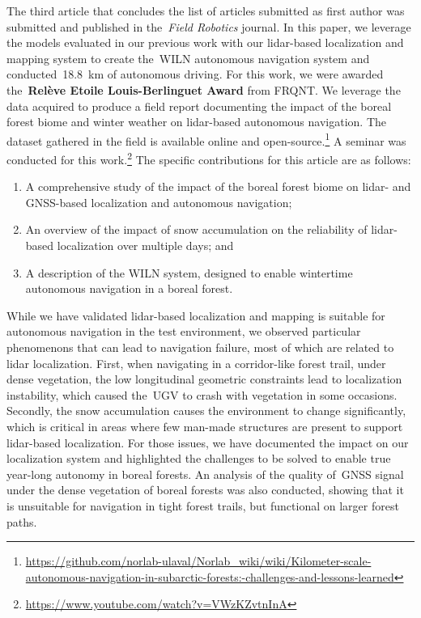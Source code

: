 \documentclass[12pt,letterpaper,oneside]{article}
\begin{document}
The third article that concludes the list of articles submitted as first author was submitted and published in the~\emph{Field Robotics} journal.
In this paper, we leverage the models evaluated in our previous work with our lidar-based localization and mapping system to create the~\ac{WILN} autonomous navigation system and conducted~\SI{18.8}{\kilo\meter} of autonomous driving.
For this work, we were awarded the~\textbf{Relève Etoile Louis-Berlinguet Award} from FRQNT.
We leverage the data acquired to produce a field report documenting the impact of the boreal forest biome and winter weather on lidar-based autonomous navigation.
The dataset gathered in the field is available online and open-source.\footnote{\textwidth\url{https://github.com/norlab-ulaval/Norlab_wiki/wiki/Kilometer-scale-autonomous-navigation-in-subarctic-forests:-challenges-and-lessons-learned}}
A seminar was conducted for this work.\footnote{\url{https://www.youtube.com/watch?v=VWzKZvtnInA}}
The specific contributions for this article are as follows:
\begin{enumerate}
	\item A comprehensive study of the impact of the boreal forest biome on lidar- and \ac{GNSS}-based localization and autonomous navigation;  
	\item An overview of the impact of snow accumulation on the reliability of lidar-based localization over multiple days; and
	\item A description of the \ac{WILN} system, designed to enable wintertime autonomous navigation in a boreal forest.
\end{enumerate}
While we have validated lidar-based localization and mapping is suitable for autonomous navigation in the test environment, we observed particular phenomenons that can lead to navigation failure, most of which are related to lidar localization.
First, when navigating in a corridor-like forest trail, under dense vegetation, the low longitudinal geometric constraints lead to localization instability, which caused the~\ac{UGV} to crash with vegetation in some occasions.
Secondly, the snow accumulation causes the environment to change significantly, which is critical in areas where few man-made structures are present to support lidar-based localization.
For those issues, we have documented the impact on our localization system and highlighted the challenges to be solved to enable true year-long autonomy in boreal forests.
An analysis of the quality of~\ac{GNSS} signal under the dense vegetation of boreal forests was also conducted, showing that it is unsuitable for navigation in tight forest trails, but functional on larger forest paths.
\end{document}
